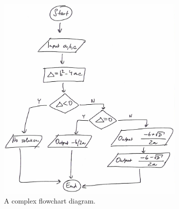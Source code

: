 \documentclass[conference]{IEEEtran}
\begin{document}
\begin{figure}[htbp]
	\begin{subfigure}[b]{0.45\linewidth}
		\includegraphics[width=\linewidth]{ex5.png}
		\caption{A complex flowchart diagram.}
	\end{subfigure}
	\hfill
	\begin{subfigure}[b]{0.45\linewidth}

\end{subfigure}
\end{figure}
\end{document}
